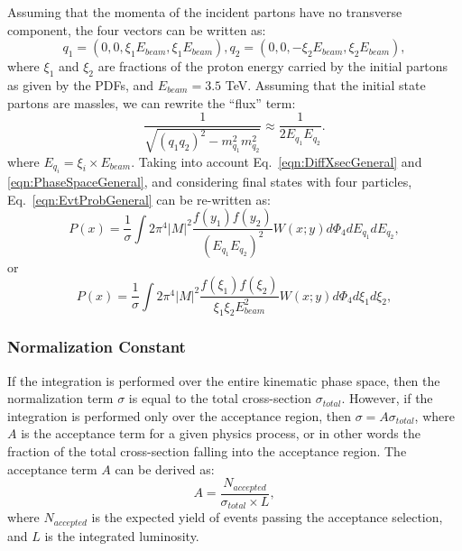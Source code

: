 \documentclass{cmspaper}
\begin{document}
Assuming that  the momenta of the incident partons have no transverse component, the four vectors can be written as:
\begin{equation}
q_{1}=(0,0,\xi_{1}E_{beam},\xi_{1}E_{beam}),
q_{2}=(0,0,-\xi_{2}E_{beam},\xi_{2}E_{beam}),
\label{eqn:EvtProbGeneral2}  
\end{equation}
where $\xi_{1}$ and $\xi_{2}$ are fractions of the proton energy carried by the initial partons as given by the PDFs, and
$E_{beam}=3.5$ TeV. Assuming that the initial state partons are massles, we can rewrite the ``flux'' term:
\begin{equation}
\frac{1}{\sqrt{(q_{1}q_{2})^{2}-m_{q_{1}}^{2}m_{q_{2}}^{2}}} \approx \frac{1}{2 E_{q_{1}}E_{q_{2}}}.
\label{eqn:flux}  
\end{equation}
where $E_{q_{i}} = \xi_i\times E_{beam}$.  
Taking into account Eq.~\ref{eqn:DiffXsecGeneral} and \ref{eqn:PhaseSpaceGeneral}, and considering final states with four particles,
Eq.~\ref{eqn:EvtProbGeneral} can be re-written as:
\begin{equation}
P(x)=\frac{1}{ \sigma}\int 2 \pi^{4} \left| M \right|^{2} \frac{f(y_{1})f(y_{2})}{(E_{q_{1}}E_{q_{2}})^{2}}W(x;y)d\Phi_{4}dE_{q_{1}}dE_{q_{2}},
\label{eqn:EvtProbGeneral3}  
\end{equation}
or
\begin{equation}
P(x)=\frac{1}{\sigma }\int 2 \pi^{4} \left| M \right|^{2} \frac{f(\xi_{1})f(\xi_{2})}{\xi_{1}\xi_{2}E_{beam}^{2}}W(x;y)d\Phi_{4}d\xi_{1}d\xi_{2},
\label{eqn:EvtProbGeneral4}  
\end{equation}

\subsubsection{Normalization Constant}
If the integration is performed over the entire kinematic phase space, then the normalization term $\sigma$ is equal
to the total cross-section $\sigma_{total}$.  However, if the integration is performed only over the acceptance region,
then $\sigma=A\sigma_{total}$, where $A$ is the acceptance term for a given physics process, or in other words the fraction
of the total cross-section falling into the acceptance region.  The acceptance term $A$ can be derived as:
\begin{equation}
A=\frac{N_{accepted}}{\sigma_{total}\times L},
\label{eqn:Acceptance}  
\end{equation}
where $N_{accepted}$ is the expected yield of events passing the acceptance selection, and $L$ is the integrated luminosity.
\end{document}
